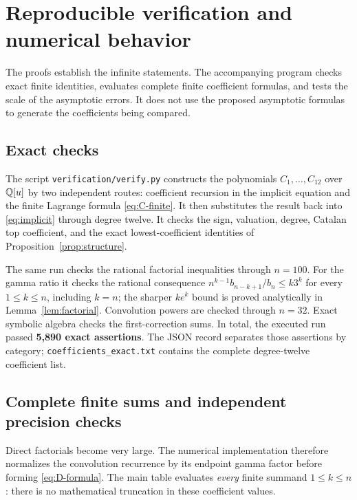 \section{Reproducible verification and numerical behavior}
\label{sec:verification}

The proofs establish the infinite statements. The accompanying program
checks exact finite identities, evaluates complete finite coefficient
formulas, and tests the scale of the asymptotic errors. It does not use
the proposed asymptotic formulas to generate the coefficients being
compared.

\subsection{Exact checks}

The script \texttt{verification/verify.py} constructs the polynomials
$C_1,\ldots,C_{12}$ over $\mathbb Q[u]$ by two independent routes:
coefficient recursion in the implicit equation and the finite Lagrange
formula \eqref{eq:C-finite}. It then substitutes the result back into
\eqref{eq:implicit} through degree twelve. It checks the sign, valuation,
degree, Catalan top coefficient, and the exact lowest-coefficient
identities of Proposition~\ref{prop:structure}.

The same run checks the rational factorial inequalities through $n=100$.
For the gamma ratio it checks the rational consequence
$n^{k-1}b_{n-k+1}/b_n\le k3^k$ for every $1\le k\le n$, including
$k=n$; the sharper $ke^k$ bound is proved analytically in
Lemma~\ref{lem:factorial}. Convolution powers are checked through $n=32$. Exact symbolic
algebra checks the first-correction sums. In total, the executed run
passed \textbf{5,890 exact assertions}. The JSON record separates those
assertions by category; \texttt{coefficients\_exact.txt} contains the
complete degree-twelve coefficient list.

\subsection{Complete finite sums and independent precision checks}

Direct factorials become very large. The numerical implementation
therefore normalizes the convolution recurrence by its endpoint gamma
factor before forming \eqref{eq:D-formula}. The main table evaluates
\emph{every} finite summand $1\le k\le n$: there is no mathematical
truncation in these coefficient values.

